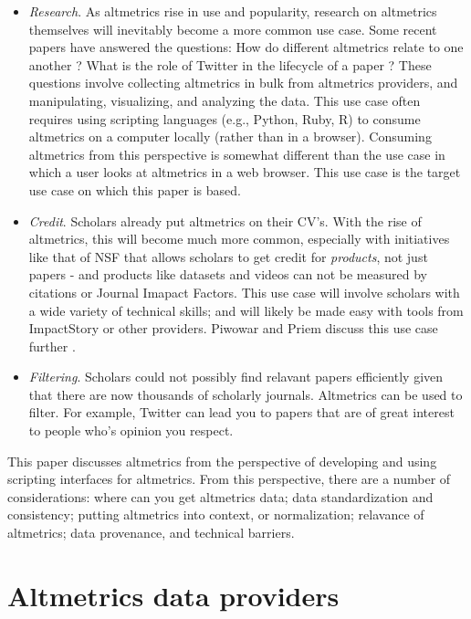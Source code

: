 \documentclass[letterpaper,superscriptaddress,showkeys,longbibliography]{revtex4-1}\usepackage{graphicx, color}
\begin{document}
\begin{itemize}
  \item \emph{Research}. As altmetrics rise in use and popularity, research on altmetrics themselves will inevitably become a more common use case. Some recent papers have answered the questions: How do different altmetrics relate to one another \cite{yan2011,bollen2009}? What is the role of Twitter in the lifecycle of a paper \cite{darling2013}? These questions involve collecting altmetrics in bulk from altmetrics providers, and manipulating, visualizing, and analyzing the data. This use case often requires using scripting languages (e.g., Python, Ruby, R) to consume altmetrics on a computer locally (rather than in a browser). Consuming altmetrics from this perspective is somewhat different than the use case in which a user looks at altmetrics in a web browser. This use case is the target use case on which this paper is based. 
  \item \emph{Credit}. Scholars already put altmetrics on their CV's. With the rise of altmetrics, this will become much more common, especially with initiatives like that of NSF that allows scholars to get credit for \emph{products}, not just papers - and products like datasets and videos can not be measured by citations or Journal Imapact Factors. This use case will involve scholars with a wide variety of technical skills; and will likely be made easy with tools from ImpactStory or other providers. Piwowar and Priem discuss this use case further \cite{piwowar2013power}. 
  \item \emph{Filtering}. Scholars could not possibly find relavant papers efficiently given that there are now thousands of scholarly journals. Altmetrics can be used to filter. For example, Twitter can lead you to papers that are of great interest to people who's opinion you respect.
\end{itemize}


This paper discusses altmetrics from the perspective of developing and using scripting interfaces for altmetrics. From this perspective, there are a number of considerations: where can you get altmetrics data; data standardization and consistency; putting altmetrics into context, or normalization; relavance of altmetrics; data provenance, and technical barriers.

\section*{Altmetrics data providers}
\end{document}
